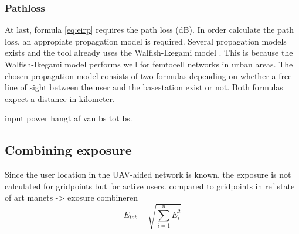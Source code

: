 \subsubsection{Pathloss}
\label{subsec:pl}
At last, formula \ref{eq:eirp} requires the path loss (dB). In order calculate the path loss, an appropiate propagation model is required. Several propagation models exists and the tool already uses the Walfish-Ikegami model \cite{J2}.
This is because the Walfish-Ikegami model performs well for femtocell networks in urban areas. %
The chosen propagation model consists of two formulas depending on whether a free line of sight between the user and the basestation exist or not. Both formulas expect a distance in kilometer. %

input power hangt af van bs tot bs.

\subsection{Combining exposure}
\label{sec:combiningexposure}
Since the user location in the UAV-aided network is known, the exposure is not calculated for gridpoints but for active users. compared to gridpoints in ref state of art
manets -> exosure combineren
\begin{equation}
E_{tot} = \sqrt{\sum_{i=1}^{n} E_i^2}
\label{eq:totalexposure}
\end{equation}






